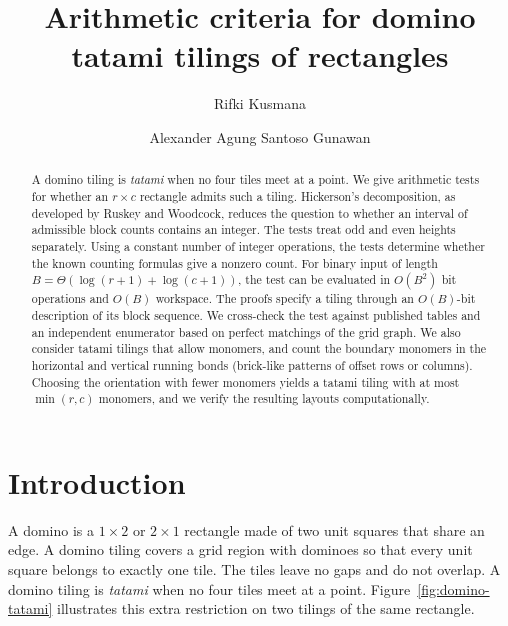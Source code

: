 \documentclass[11pt, reqno]{amsart}
\title{Arithmetic criteria for domino tatami tilings of rectangles}
\author{Rifki Kusmana}
\author{Alexander Agung Santoso Gunawan}
\theoremstyle{definition}
\theoremstyle{remark}
\numberwithin{equation}{section}
\begin{document}
\begin{abstract}
    A domino tiling is \emph{tatami} when no four tiles meet at a point.
    We give arithmetic tests for whether an $r\times c$ rectangle admits
    such a tiling. Hickerson's decomposition, as developed by
    Ruskey and Woodcock, reduces the question to whether an interval of
    admissible block counts contains an integer. The tests treat odd
    and even heights separately. Using a constant number of integer
    operations, the tests determine whether the known counting formulas
    give a nonzero count.
    For binary input of length $B=\Theta(\log(r+1)+\log(c+1))$, the test
    can be evaluated in $O(B^2)$ bit operations and $O(B)$ workspace.
    The proofs specify a tiling
    through an $O(B)$-bit description of its block sequence.
    We cross-check the test against published tables and an independent
    enumerator based on perfect matchings of the grid graph.
    We also consider tatami tilings that allow monomers, and count the
    boundary monomers in the horizontal and vertical running bonds
    (brick-like patterns of offset rows or columns). Choosing the
    orientation with fewer monomers yields a tatami tiling with at most
    $\min(r,c)$ monomers, and we verify the resulting layouts computationally.
\end{abstract}


\maketitle

\section{Introduction}

A domino is a $1\times2$ or $2\times1$ rectangle made of two unit
squares that share an edge. A domino tiling covers a grid region with
dominoes so that every unit square belongs to exactly one tile.
The tiles leave no gaps and do not overlap. A domino tiling is
\emph{tatami} when no four tiles meet at a point.
Figure~\ref{fig:domino-tatami} illustrates this extra restriction on
two tilings of the same rectangle.
\end{document}
